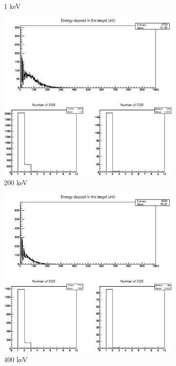 \begin{figure}
\begin{subfigure}{.5\textwidth}
  \caption{1 keV}
  \label{fig:subi5}
\end{subfigure}%
\begin{subfigure}{.5\textwidth}
  \centering
  \includegraphics[width=.78\linewidth]{./Figures/66.eps}
  \caption{200 keV}
  \label{fig:subi6}
\end{subfigure}
\begin{subfigure}{.5\textwidth}
  \centering
  \includegraphics[width=.78\linewidth]{./Figures/77.eps}
  \caption{400 keV}
  \label{fig:subi7}
\end{subfigure}%
\begin{subfigure}{.5\textwidth}
  \centering

\end{subfigure}
\end{figure}
